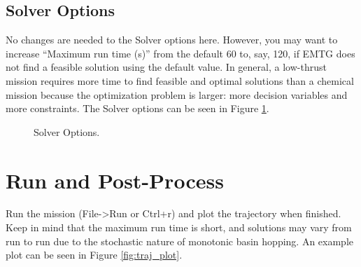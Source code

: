 \documentclass[11pt]{article}
\begin{document}
\subsection{Solver Options}
\label{sec:solver_options}

No changes are needed to the Solver options here. However, you may want to increase “Maximum run time (s)” from the default 60 to, say, 120, if \ac{EMTG} does not find a feasible solution using the default value. In general, a low-thrust mission requires more time to find feasible and optimal solutions than a chemical mission because the optimization problem is larger: more decision variables and more constraints. The Solver options can be seen in Figure \ref{fig:solver_options}.

\begin{figure}[H]
	\centering
	\caption{\label{fig:solver_options}Solver Options.}
\end{figure}

\section{Run and Post-Process}
\label{sec:run_and_post_process}

Run the mission (File-\textgreater Run or Ctrl+r) and plot the trajectory when finished. Keep in mind that the maximum run time is short, and solutions may vary from run to run due to the stochastic nature of monotonic basin hopping. An example plot can be seen in Figure \ref{fig:traj_plot}.
\end{document}
